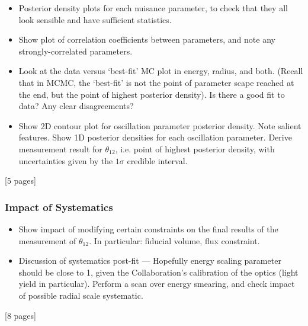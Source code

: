 {
    \color{blue}
    \begin{itemize}
        \item Posterior density plots for each nuisance parameter, to check that they all look sensible and have sufficient statistics.
        \item Show plot of correlation coefficients between parameters, and note any strongly-correlated parameters.
        \item Look at the data versus `best-fit' MC plot in energy, radius, and both. (Recall that in MCMC, the `best-fit' is not the point of parameter scape reached at the end, but the point of highest posterior density). Is there a good fit to data? Any clear disagreements?
        \item Show 2D contour plot for oscillation parameter posterior density. Note salient features. Show 1D posterior densities for each oscillation parameter. Derive measurement result for $\theta_{12}$, i.e. point of highest posterior density, with uncertainties given by the $1\sigma$ credible interval.
    \end{itemize}
    [5 pages]
    \subsubsection{Impact of Systematics}\label{sec:systematics_impact}
    \begin{itemize}
        \item Show impact of modifying certain constraints on the final results of the measurement of $\theta_{12}$. In particular: fiducial volume, \beight{} flux constraint.
        \item Discussion of systematics post-fit --- Hopefully energy scaling parameter should be close to 1, given the Collaboration's calibration of the optics (light yield in particular). Perform a scan over energy smearing, and check impact of possible radial scale systematic.
    \end{itemize}
    [8 pages]
    
}
